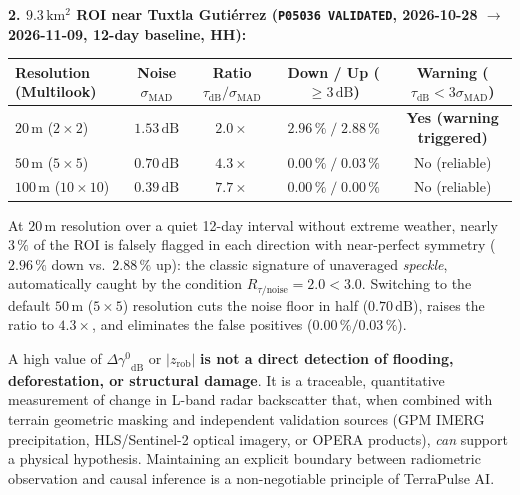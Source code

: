 \documentclass[11pt,a4paper]{article}
\newcommand{\unit}[1]{\mathrm{#1}}
\newcommand{\gz}{\ensuremath{\gamma^{0}}}
\begin{document}
\begin{ejemplo}
\noindent\textbf{2. $9.3\,\unit{km^2}$ ROI near Tuxtla Guti\'errez (\texttt{P05036 VALIDATED}, 2026-10-28 $\to$ 2026-11-09, 12-day baseline, HH):}
\begin{center}
\small
\begin{tabular}{lcccc}
\toprule
\textbf{Resolution (Multilook)} & \textbf{Noise $\sigma_{\mathrm{MAD}}$} & \textbf{Ratio $\tau_{\mathrm{dB}}/\sigma_{\mathrm{MAD}}$} & \textbf{Down / Up ($\ge 3\,\unit{dB}$)} & \textbf{Warning ($\tau_{\mathrm{dB}} < 3\sigma_{\mathrm{MAD}}$)} \\
\midrule
$20\,\unit{m}$ ($2\times 2$)   & $1.53\,\unit{dB}$ & $2.0\times$ & $2.96\,\text{\%} \;/\; 2.88\,\text{\%}$ & \textbf{Yes (warning triggered)} \\
$50\,\unit{m}$ ($5\times 5$)   & $0.70\,\unit{dB}$ & $4.3\times$ & $0.00\,\text{\%} \;/\; 0.03\,\text{\%}$ & No (reliable) \\
$100\,\unit{m}$ ($10\times 10$) & $0.39\,\unit{dB}$ & $7.7\times$ & $0.00\,\text{\%} \;/\; 0.00\,\text{\%}$ & No (reliable) \\
\bottomrule
\end{tabular}
\end{center}
At $20\,\unit{m}$ resolution over a quiet 12-day interval without extreme weather, nearly $3\,\text{\%}$ of the ROI is falsely flagged in each direction with near-perfect symmetry ($2.96\,\text{\%}$ down vs.\ $2.88\,\text{\%}$ up): the classic signature of unaveraged \emph{speckle}, automatically caught by the condition $R_{\tau/\text{noise}} = 2.0 < 3.0$. Switching to the default $50\,\unit{m}$ ($5\times 5$) resolution cuts the noise floor in half ($0.70\,\unit{dB}$), raises the ratio to $4.3\times$, and eliminates the false positives ($0.00\,\text{\%} / 0.03\,\text{\%}$).
\end{ejemplo}

\begin{atencion}
A high value of $\Delta\gz_{\mathrm{dB}}$ or $|z_{\mathrm{rob}}|$ \textbf{is not a direct detection of flooding, deforestation, or structural damage}. It is a traceable, quantitative measurement of change in L-band radar backscatter that, when combined with terrain geometric masking and independent validation sources (GPM IMERG precipitation, HLS/Sentinel-2 optical imagery, or OPERA products), \emph{can} support a physical hypothesis. Maintaining an explicit boundary between radiometric observation and causal inference is a non-negotiable principle of TerraPulse AI.
\end{atencion}
\end{document}
